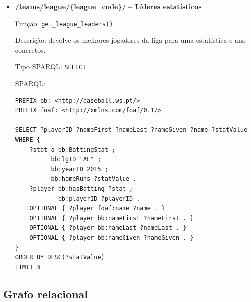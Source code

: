 \begin{itemize}[leftmargin=*]
  \item \textbf{/teams/league/\{league\_code\}/ -- L\'ideres estat\'isticos}
  
  Fun\c{c}\~ao: \texttt{get\_league\_leaders()}
  
  Descri\c{c}\~ao: devolve os melhores jogadores da liga para uma estatística e ano concretos.
  
  Tipo SPARQL: \texttt{SELECT}

  SPARQL:

\begin{Verbatim}[fontsize=\scriptsize,breaklines=true]
PREFIX bb: <http://baseball.ws.pt/>
PREFIX foaf: <http://xmlns.com/foaf/0.1/>

SELECT ?playerID ?nameFirst ?nameLast ?nameGiven ?name ?statValue
WHERE {
    ?stat a bb:BattingStat ;
          bb:lgID "AL" ;
          bb:yearID 2015 ;
          bb:homeRuns ?statValue .
    ?player bb:hasBatting ?stat ;
            bb:playerID ?playerID .
    OPTIONAL { ?player foaf:name ?name . }
    OPTIONAL { ?player bb:nameFirst ?nameFirst . }
    OPTIONAL { ?player bb:nameLast ?nameLast . }
    OPTIONAL { ?player bb:nameGiven ?nameGiven . }
}
ORDER BY DESC(?statValue)
LIMIT 3
\end{Verbatim}
\end{itemize}

\subsection{Grafo relacional}


